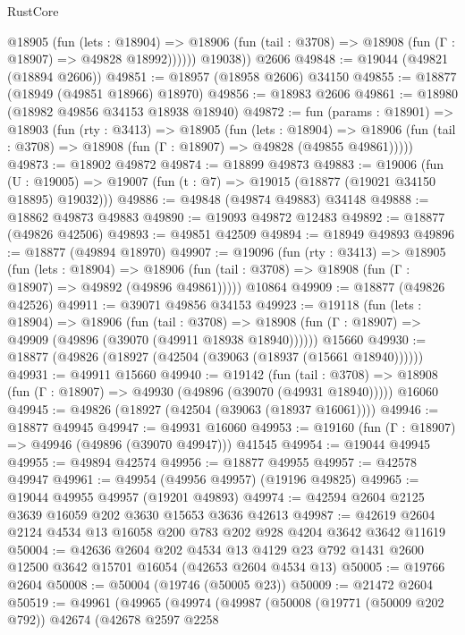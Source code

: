 \begin{lexlean}{RustCore}
\begin{coremodule}
            @18905
              (fun (lets : @18904) =>
              @18906 (fun (tail : @3708) => @18908 (fun (Γ : @18907) => @49828 @18992))))))
        @19038))
    @2606
@49848 := @19044 (@49821 (@18894 @2606))
@49851 := @18957 (@18958 @2606) @34150
@49855 := @18877 (@18949 (@49851 @18966) @18970)
@49856 := @18983 @2606
@49861 := @18980 (@18982 @49856 @34153 @18938 @18940)
@49872 := fun (params : @18901) =>
  @18903
    (fun (rty : @3413) =>
    @18905
      (fun (lets : @18904) =>
      @18906 (fun (tail : @3708) => @18908 (fun (Γ : @18907) => @49828 (@49855 @49861)))))
@49873 := @18902 @49872
@49874 := @18899 @49873
@49883 := @19006
    (fun (U : @19005) => @19007 (fun (t : @7) => @19015 (@18877 (@19021 @34150 @18895) @19032)))
@49886 := @49848 (@49874 @49883) @34148
@49888 := @18862 @49873 @49883
@49890 := @19093 @49872 @12483
@49892 := @18877 (@49826 @42506)
@49893 := @49851 @42509
@49894 := @18949 @49893
@49896 := @18877 (@49894 @18970)
@49907 := @19096
    (fun (rty : @3413) =>
    @18905
      (fun (lets : @18904) =>
      @18906 (fun (tail : @3708) => @18908 (fun (Γ : @18907) => @49892 (@49896 @49861)))))
    @10864
@49909 := @18877 (@49826 @42526)
@49911 := @39071 @49856 @34153
@49923 := @19118
    (fun (lets : @18904) =>
    @18906
      (fun (tail : @3708) =>
      @18908 (fun (Γ : @18907) => @49909 (@49896 (@39070 (@49911 @18938 @18940))))))
    @15660
@49930 := @18877 (@49826 (@18927 (@42504 (@39063 (@18937 (@15661 @18940))))))
@49931 := @49911 @15660
@49940 := @19142
    (fun (tail : @3708) => @18908 (fun (Γ : @18907) => @49930 (@49896 (@39070 (@49931 @18940)))))
    @16060
@49945 := @49826 (@18927 (@42504 (@39063 (@18937 @16061))))
@49946 := @18877 @49945
@49947 := @49931 @16060
@49953 := @19160 (fun (Γ : @18907) => @49946 (@49896 (@39070 @49947))) @41545
@49954 := @19044 @49945
@49955 := @49894 @42574
@49956 := @18877 @49955
@49957 := @42578 @49947
@49961 := @49954 (@49956 @49957) (@19196 @49825)
@49965 := @19044 @49955 @49957 (@19201 @49893)
@49974 := @42594 @2604 @2125 @3639 @16059 @202 @3630 @15653 @3636 @42613
@49987 := @42619 @2604 @2124 @4534 @13 @16058 @200 @783 @202 @928 @4204 @3642 @3642 @11619
@50004 := @42636
    @2604
    @202
    @4534
    @13
    @4129
    @23
    @792
    @1431
    @2600
    @12500
    @3642
    @15701
    @16054
    (@42653 @2604 @4534 @13)
@50005 := @19766 @2604
@50008 := @50004 (@19746 (@50005 @23))
@50009 := @21472 @2604
@50519 := @49961
    (@49965
      (@49974
        (@49987
          (@50008
            (@19771 (@50009 @202 @792))
            @42674
            (@42678
              @2597
              @2258

\end{coremodule}
\end{lexlean}
